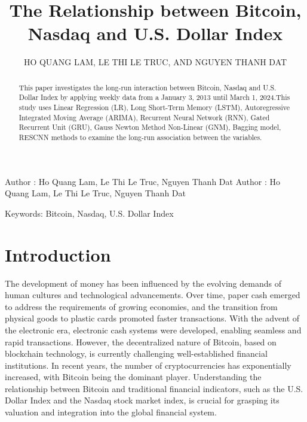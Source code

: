 \documentclass{ieeeojies}
\begin{document}
\title{The Relationship between Bitcoin, Nasdaq and U.S. Dollar Index}

\author{\uppercase{Ho Quang Lam},
\uppercase{Le Thi Le Truc, and Nguyen Thanh Dat}}

\address[1]{Faculty of Information Systems, University of Information Technology, (e-mail: 21521049@gm.uit.edu.vn)}
\address[2]{Faculty of Information Systems, University of Information Technology, (e-mail: 21521586@gm.uit.edu.vn)}
\address[3]{Faculty of Information Systems, University of Information Technology, (e-mail: 21521938@gm.uit.edu.vn)}

\markboth
{Author \headeretal: Ho Quang Lam, Le Thi Le Truc, Nguyen Thanh Dat}
{Author \headeretal: Ho Quang Lam, Le Thi Le Truc, Nguyen Thanh Dat}

\begin{abstract}
This paper investigates the long-run interaction between Bitcoin, Nasdaq and U.S. Dollar Index by applying weekly data from a
January 3, 2013 until March 1, 2024.This study uses  Linear Regression (LR), Long Short-Term Memory (LSTM), Autoregressive Integrated Moving Average (ARIMA), Recurrent Neural Network (RNN), Gated Recurrent Unit (GRU), Gauss Newton Method Non-Linear (GNM), Bagging model, RESCNN methods to examine the long-run association between the variables.
\end{abstract}

\begin{keywords}
Keywords: Bitcoin, Nasdaq, U.S. Dollar Index
\end{keywords}

\titlepgskip=-15pt

\maketitle

\section{Introduction}
\label{sec:introduction}
The development of money has been influenced by the evolving demands of human cultures and technological advancements. Over time, paper cash emerged to address the requirements of growing economies, and the transition from physical goods to plastic cards promoted faster transactions. With the advent of the electronic era, electronic cash systems were developed, enabling seamless and rapid transactions. However, the decentralized nature of Bitcoin, based on blockchain technology, is currently challenging well-established financial institutions. In recent years, the number of cryptocurrencies has exponentially increased, with Bitcoin being the dominant player. Understanding the relationship between Bitcoin and traditional financial indicators, such as the U.S. Dollar Index and the Nasdaq stock market index, is crucial for grasping its valuation and integration into the global financial system.
\end{document}
